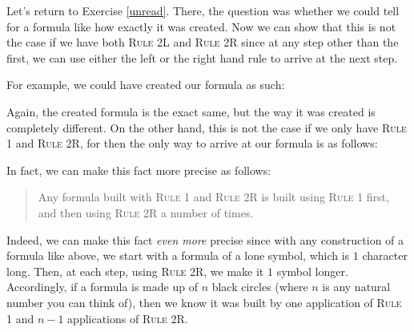 Let's return to Exercise \ref{unread}. There, the question was whether we could tell for a formula like \bcirc\bcirc\bcirc\bcirc{} how exactly it was created. Now we can show that this is not the case if we have both \textsc{Rule 2L} and \textsc{Rule 2R} since at any step other than the first, we can use either the left or the right hand rule to arrive at the next step.

For example, we could have created our formula as such:

\medskip
\begin{axiomatic}
\end{axiomatic}
\medskip

Again, the created formula is the exact same, but the way it was created is completely different. On the other hand, this is not the case if we only have \textsc{Rule 1} and \textsc{Rule 2R}, for then the only way to arrive at our formula is as follows: 

\medskip
\begin{axiomatic}
\end{axiomatic}
\medskip

In fact, we can make this fact more precise as follows:

\begin{quote}
Any formula built with \textsc{Rule 1} and \textsc{Rule 2R} is built using \textsc{Rule 1} first, and then using \textsc{Rule 2R} a number of times. 
\end{quote}

Indeed, we can make this fact \textit{even more} precise since with any construction of a formula like above, we start with a formula of a lone symbol, which is $1$ character long. Then, at each step, using \textsc{Rule 2R}, we make it $1$ symbol longer. Accordingly, if a formula is made up of $n$ black circles (where $n$ is any natural number you can think of), then we know it was built by one application of \textsc{Rule 1} and $n-1$ applications of \textsc{Rule 2R}.


